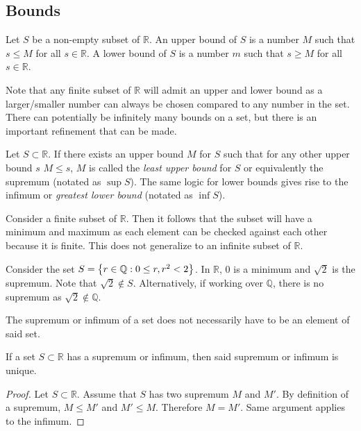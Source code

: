 \documentclass[../notes.tex]{subfiles}
\begin{document}

\subsection{Bounds}

\begin{definition}
	Let $S$ be a non-empty subset of $\mathbb{R}$. An upper bound of $S$ is a number $M$ such that $s \leq M$ for all $s \in \mathbb{R}$. A lower bound of $S$ is a number $m$ such that $s \geq M$ for all $s \in \mathbb{R}$.
\end{definition}

Note that any finite subset of $\mathbb{R}$ will admit an upper and lower bound as a larger/smaller number can always be chosen compared to any number in the set. There can potentially be infinitely many bounds on a set, but there is an important refinement that can be made.

\begin{definition}
	Let $S \subset \mathbb{R}$. If there exists an upper bound $M$ for $S$ such that for any other upper bound $s$ $M \leq s$, $M$ is called the \textit{least upper bound} for $S$ or equivalently the supremum (notated as $\sup S$). The same logic for lower bounds gives rise to the infimum or \textit{greatest lower bound} (notated as $\inf S$).
\end{definition}

Consider a finite subset of $\mathbb{R}$. Then it follows that the subset will have a minimum and maximum as each element can be checked against each other because it is finite. This does not generalize to an infinite subset of $\mathbb{R}$.

\begin{example}
	\label{ex:rationalsupremum}
	Consider the set $S = \qty{r \in \mathbb{Q} : 0 \leq r, r^2 < 2}$. In $\mathbb{R}$, $0$ is a minimum and $\sqrt{2}$ is the supremum. Note that $\sqrt{2} \not\in S$. Alternatively, if working over $\mathbb{Q}$, there is no supremum as $\sqrt{2} \not\in \mathbb{Q}$.
\end{example}

\begin{remark}
	The supremum or infimum of a set does not necessarily have to be an element of said set.
\end{remark}

\begin{theorem}
	If a set $S \subset \mathbb{R}$ has a supremum or infimum, then said supremum or infimum is unique.
\end{theorem}
\begin{proof}
	Let $S \subset \mathbb{R}$. Assume that $S$ has two supremum $M$ and $M'$. By definition of a supremum, $M \leq M'$ and $M' \leq M$. Therefore $M = M'$. Same argument applies to the infimum.
\end{proof}
\end{document}
